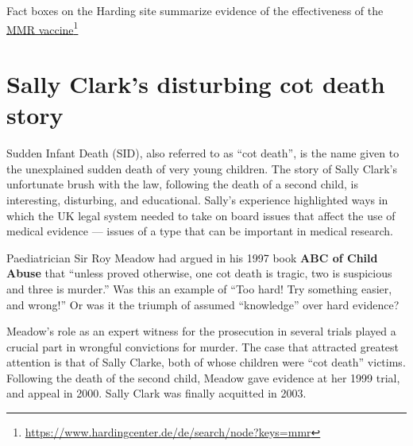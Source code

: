 \documentclass[
  10pt,
  b5paper]{book}
\begin{document}
Fact boxes on the Harding site summarize evidence of the
effectiveness of the \href{https://www.hardingcenter.de/de/search/node?keys=mmr}{MMR vaccine}\footnote{\url{https://www.hardingcenter.de/de/search/node?keys=mmr}}

\hypertarget{sally-clarks-disturbing-cot-death-story}{%
\section{Sally Clark's disturbing cot death story}\label{sally-clarks-disturbing-cot-death-story}}

Sudden Infant Death (SID), also referred to as ``cot death'',
is the name given to the unexplained sudden death of very
young children. The story of Sally Clark's unfortunate brush
with the law, following the death of a second child, is
interesting, disturbing, and educational. Sally's experience
highlighted ways in which the UK legal system needed to take
on board issues that affect the use of medical evidence ---
issues of a type that can be important in medical research.

Paediatrician Sir Roy Meadow had argued in his 1997 book
\textbf{ABC of Child Abuse} that ``unless proved otherwise,
one cot death is tragic, two is suspicious and three is murder.''
Was this an example of ``Too hard! Try something easier, and wrong!''
Or was it the triumph of assumed ``knowledge'' over hard evidence?

Meadow's role as an expert witness for the prosecution in several
trials played a crucial part in wrongful convictions for murder.
The case that attracted greatest attention is that of Sally Clarke,
both of whose children were ``cot death'' victims. Following the
death of the second child, Meadow gave evidence at her 1999 trial,
and appeal in 2000. Sally Clark was finally acquitted in 2003.
\end{document}
